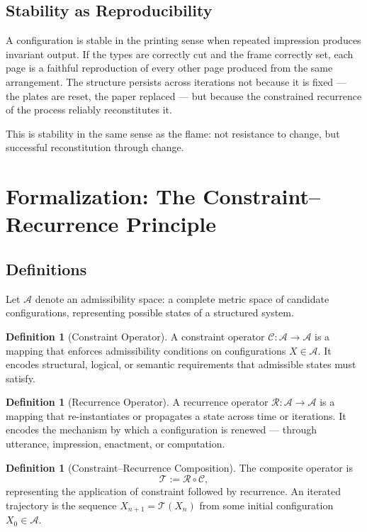 \documentclass[12pt, oneside]{article}
\theoremstyle{definition}
\newtheorem{definition}[theorem]{Definition}
\theoremstyle{remark}
\begin{document}
\subsection{Stability as Reproducibility}

A configuration is stable in the printing sense when repeated impression produces invariant output.
If the types are correctly cut and the frame correctly set, each page is a faithful reproduction of every other page produced from the same arrangement.
The structure persists across iterations not because it is fixed --- the plates are reset, the paper replaced --- but because the constrained recurrence of the process reliably reconstitutes it.

This is stability in the same sense as the flame: not resistance to change, but successful reconstitution through change.

\section{Formalization: The Constraint--Recurrence Principle}
\label{sec:formal}

\subsection{Definitions}

Let $\mathcal{A}$ denote an admissibility space: a complete metric space of candidate configurations, representing possible states of a structured system.

\begin{definition}[Constraint Operator]
A constraint operator $\mathcal{C}: \mathcal{A} \to \mathcal{A}$ is a mapping that enforces admissibility conditions on configurations $X \in \mathcal{A}$.
It encodes structural, logical, or semantic requirements that admissible states must satisfy.
\end{definition}

\begin{definition}[Recurrence Operator]
A recurrence operator $\mathcal{R}: \mathcal{A} \to \mathcal{A}$ is a mapping that re-instantiates or propagates a state across time or iterations.
It encodes the mechanism by which a configuration is renewed --- through utterance, impression, enactment, or computation.
\end{definition}

\begin{definition}[Constraint--Recurrence Composition]
The composite operator is
\[
\mathcal{T} := \mathcal{R} \circ \mathcal{C},
\]
representing the application of constraint followed by recurrence.
An iterated trajectory is the sequence $X_{n+1} = \mathcal{T}(X_{n})$ from some initial configuration $X_{0} \in \mathcal{A}$.
\end{definition}
\end{document}
